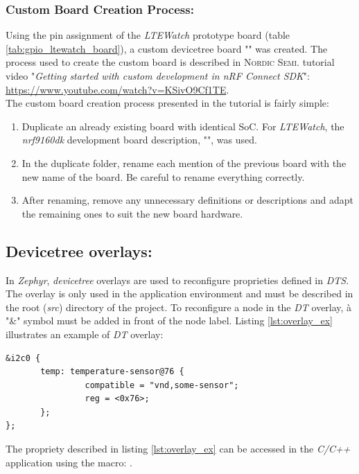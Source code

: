 \documentclass[report.tex]{subfiles}
\begin{document}
\subsubsection{Custom Board Creation Process:}

Using the pin assignment of the \textit{LTEWatch} prototype board (table \ref{tab:gpio_ltewatch_board}), a custom devicetree board "" was created. The process used to create the custom board is described in \textsc{Nordic Semi.} tutorial video "\textit{Getting started with custom development in nRF Connect SDK}": \url{https://www.youtube.com/watch?v=KSivO9Cf1TE}.\\

The custom board creation process presented in the tutorial is fairly simple:
\begin{enumerate}
\item Duplicate an already existing board with identical SoC. For \textit{LTEWatch}, the \textit{nrf9160dk} development board description, "", was used.
\item In the duplicate folder, rename each mention of the previous board with the new name of the board. Be careful to rename everything correctly.
\item After renaming, remove any unnecessary definitions or descriptions and adapt the remaining ones to suit the new board hardware.
\end{enumerate}


\subsection{Devicetree overlays:}
In \textit{Zephyr}, \textit{devicetree} overlays are used to reconfigure proprieties defined in \textit{DTS}. The overlay is only used in the application environment and must be described in the root (\textit{src}) directory of the project. To reconfigure a node in the \textit{DT} overlay, à "\&" symbol must be added in front of the node label. Listing \ref{lst:overlay_ex} illustrates an example of \textit{DT} overlay:

\begin{lstlisting}[style=C,label={lst:overlay_ex},caption={\textit{DT} Overlay Example}]
&i2c0 {
       temp: temperature-sensor@76 {
                compatible = "vnd,some-sensor";
                reg = <0x76>;
       };
};
\end{lstlisting}

The propriety described in listing \ref{lst:overlay_ex} can be accessed in the \textit{C/C++} application using the macro: .
\end{document}
